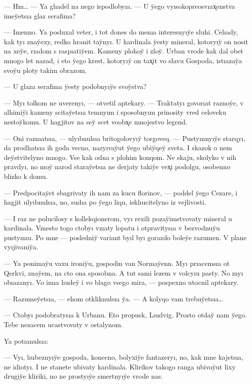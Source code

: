 \documentclass[10pt]{book}
\begin{document}
— Hm… — Ya glıadel na nego ispodlobyıa. — U y̆ego vyısokopreosvıax̨enstva imey̆etsıa glaz serafima?

— Imenno. Ya posluxal veter, i tot dones do menıa interesnyıy̆e sluhi. Celıady, kak tyı znay̆exy, redko hranit tay̆nyı. U kardinala y̆esty mineral, kotoryıy̆ on nosit na xey̆e, rıadom s raspıatiy̆em. Kameny plohoy̆ i zloy̆. Urban vrode kak dal obet mnogo let nazad, i eto y̆ego krest, kotoryıy̆ on tax̨it vo slavu Gospoda, istıazay̆a svoy̆u ploty takim obrazom.

— U glaza serafima y̆esty podobnyıy̆e svoy̆stva?

— Myı tolkom ne uverenyı, — otvetil aptekary. — Traktatyı govorıat raznoy̆e, v alhimiy̆i kameny scitay̆etsıa temnyım i sposobnyım prinosity vred celoveku nestoy̆komu. U hagjitov na sey̆ scet voobx̨e mnojestvo legend.

— Oni raznıatsıa, — ulyıbnulsıa britogolovyıy̆ torgoveq. — Pustyınnyıy̆e starqyı, da prodlıatsıa ih goda vecno, nazyıvay̆ut y̆ego ubiy̆qey̆ sveta. I skazok o nem dey̆stvitelyno mnogo. Vse kak odna s plohim konqom. Ne skaju, skolyko v nih pravdyı, no moy̆ narod staray̆etsıa ne derjaty takiy̆e vex̨i podolgu, osobenno blizko k domu.

— Predpocitay̆et sbagrivaty ih nam za kucu florinov, — poddel y̆ego Cezare, i hagjit ulyıbnulsıa, no, sudıa po y̆ego liqu, isklıucitelyno iz vejlivosti.

— I raz ne polucilosy s kollekqionerom, vyı rexili pozay̆imstvovaty mineral u kardinala. Vmesto togo ctobyı vzıaty lopatu i otpravitysıa v bezvodnuy̆u pustyınıu. Po mne — posledniy̆ variant byıl byı gorazdo boley̆e razumen. V plane vyıjivaniy̆a.

— Ya ponimay̆u vaxu ironiy̆u, gospodin van Normay̆enn. Myı prıacemsıa ot Qerkvi, znay̆em, na cto ona sposobna. A tut sami lezem v volcyıu pasty. No myı obıazanyı. Vo imıa lıudey̆ i vo blago vsego mira, — pospexno utocnil aptekary.

— Razumey̆etsıa, — ehom otkliknulsıa y̆a. — A kolyqo vam trebuy̆etsıa…

— Ctobyı podobratysıa k Urbanu. Eto propusk, Lıudvig. Prosto otday̆ nam y̆ego. Tebe nezacem ucastvovaty v ostalynom.

Ya potıanulsıa:

— Vyı, lıubeznyıy̆e gospoda, konecno, bolyxiy̆e fantazeryı, no, kak mne kajetsıa, ne idiotyı. I ne stanete ubivaty kardinala. Klirikov takogo ranga ubivay̆ut lixy drugiy̆e kliriki, no ne prostyıy̆e smertnyıy̆e vrode nas.
\end{document}
